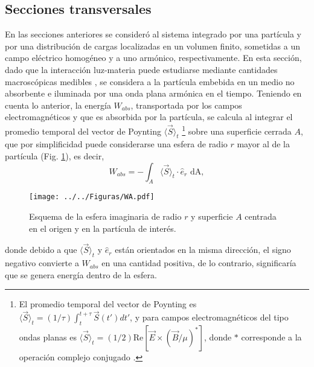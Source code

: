 \subsection{Secciones transversales}

En las secciones anteriores se consideró al sistema integrado por una partícula y por una distribución de cargas localizadas en un volumen finito, sometidas a un campo eléctrico homogéneo y a uno armónico, respectivamente. En esta sección, dado que la interacción luz-materia puede estudiarse mediante cantidades macroscópicas medibles \cite{Bohren}, se considera a la partícula embebida en un medio no absorbente e iluminada por una onda plana armónica en el tiempo. Teniendo en cuenta lo anterior, la energía $W_{abs}$, transportada por los campos electromagnéticos y que es absorbida por la partícula, se calcula al integrar el promedio temporal del vector de Poynting $\langle\Vec{S}\rangle_t$ \footnote{El promedio temporal del vector de Poynting es $\langle\Vec{S}\rangle_t = (1/\tau)\int_t^{t+\tau}\Vec{S}(t')dt'$, y para campos electromagnéticos del tipo ondas planas es $\langle\Vec{S}\rangle_t = (1/2) \text{Re}[\Vec{E} \times (\Vec{B}/\mu)^{*}]$, donde $*$ corresponde a la operación complejo conjugado \cite{Bohren}. } sobre una superficie cerrada $A$, que por simplificidad puede considerarse una esfera de radio $r$ mayor al de la partícula (Fig. \ref{WA}), es decir, 
\begin{equation*}
	W_{abs}=-\int_A \langle\Vec{S}\rangle_t\cdot\hat{e}_r \text{ dA},
	\label{flujopoynting}
\end{equation*}
\begin{figure}[h!]
	\centering
	\texttt{[image: ../../Figuras/WA.pdf]}
	\caption{Esquema de la esfera imaginaria  de radio $r$ y superficie $A$ centrada en el origen y en la partícula de interés.}
	\label{WA}
\end{figure}
donde debido a que $\langle\Vec{S}\rangle_t$ y $\hat{e}_r$ están orientados en la misma dirección, el signo negativo convierte a $W_{abs}$ en una cantidad positiva, de lo contrario, significaría que se genera energía dentro de la esfera. \cite{Bohren}\\

